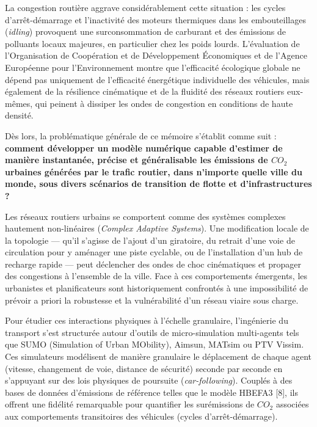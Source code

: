 \documentclass[10pt, a4paper]{article}
\begin{document}
La congestion routière aggrave considérablement cette situation : les
cycles d'arrêt-démarrage et l'inactivité des moteurs thermiques dans les
embouteillages (\emph{idling}) provoquent une surconsommation de
carburant et des émissions de polluants locaux majeures, en particulier
chez les poids lourds. L'évaluation de l'Organisation de Coopération et
de Développement Économiques et de l'Agence Européenne pour
l'Environnement montre que l'efficacité écologique globale ne dépend pas
uniquement de l'efficacité énergétique individuelle des véhicules, mais
également de la résilience cinématique et de la fluidité des réseaux
routiers eux-mêmes, qui peinent à dissiper les ondes de congestion en
conditions de haute densité.

Dès lors, la problématique générale de ce mémoire s'établit comme suit :
\textbf{comment développer un modèle numérique capable d'estimer de
manière instantanée, précise et généralisable les émissions de \(CO_2\)
urbaines générées par le trafic routier, dans n'importe quelle ville du
monde, sous divers scénarios de transition de flotte et
d'infrastructures ?}

Les réseaux routiers urbains se comportent comme des systèmes complexes
hautement non-linéaires (\emph{Complex Adaptive Systems}). Une
modification locale de la topologie --- qu'il s'agisse de l'ajout d'un
giratoire, du retrait d'une voie de circulation pour y aménager une
piste cyclable, ou de l'installation d'un hub de recharge rapide ---
peut déclencher des ondes de choc cinématiques et propager des
congestions à l'ensemble de la ville. Face à ces comportements
émergents, les urbanistes et planificateurs sont historiquement
confrontés à une impossibilité de prévoir a priori la robustesse et la
vulnérabilité d'un réseau viaire sous charge.

Pour étudier ces interactions physiques à l'échelle granulaire,
l'ingénierie du transport s'est structurée autour d'outils de
micro-simulation multi-agents tels que SUMO (Simulation of Urban
MObility), Aimsun, MATsim ou PTV Vissim. Ces simulateurs modélisent de
manière granulaire le déplacement de chaque agent (vitesse, changement
de voie, distance de sécurité) seconde par seconde en s'appuyant sur des
lois physiques de poursuite (\emph{car-following}). Couplés à des bases
de données d'émissions de référence telles que le modèle HBEFA3 {[}8{]},
ils offrent une fidélité remarquable pour quantifier les surémissions de
\(CO_2\) associées aux comportements transitoires des véhicules (cycles
d'arrêt-démarrage).
\end{document}
